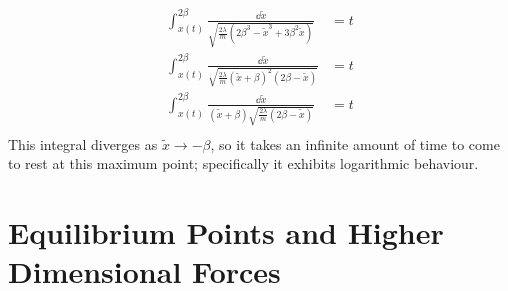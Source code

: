 \documentclass{article}
\begin{document}
\begin{align*}
    \int_{x(t)}^{2\beta} \frac{\dd \widetilde x}{\sqrt{\frac{2\lambda}{m}(2\beta^3 - \widetilde x^3 + 3 \beta^2 \widetilde x)}} & = t \\
    \int_{x(t)}^{2\beta} \frac{\dd \widetilde x}{\sqrt{\frac{2\lambda}{m}(\widetilde x + \beta)^2(2\beta - \widetilde x)}}      & = t \\
    \int_{x(t)}^{2\beta} \frac{\dd \widetilde x}{(\widetilde x + \beta)\sqrt{\frac{2\lambda}{m}(2\beta - \widetilde x)}}        & = t \\
\end{align*}
This integral diverges as $\widetilde x \to -\beta$, so it takes an infinite amount of time to come to rest at this maximum point; specifically it exhibits logarithmic behaviour.

\section{Equilibrium Points and Higher Dimensional Forces}
\end{document}
